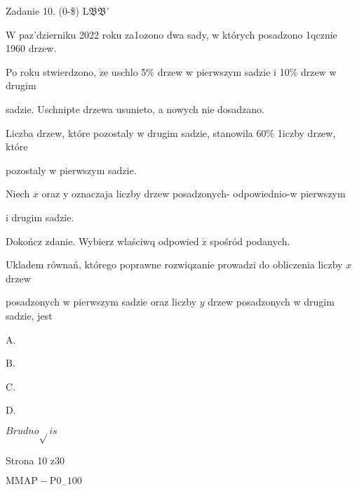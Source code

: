\documentclass[a4paper,12pt]{article}
\begin{document}
Zadanie 10. (0-{\$}) $\overline{\mathrm{L}\mathfrak{B}\mathfrak{B}}$'

$\mathrm{W}$ paz'dzierniku 2022 roku za1ozono dwa sady, w których posadzono 1qcznie 1960 drzew.

Po roku stwierdzono, $\dot{\mathrm{z}}\mathrm{e}$ uschlo 5\% drzew w pierwszym sadzie i 10\% drzew w drugim

sadzie. Uschnipte drzewa usunieto, a nowych nie dosadzano.

Liczba drzew, które pozostaly w drugim sadzie, stanowila 60\% 1iczby drzew, które

pozostaly w pierwszym sadzie.

Niech $x$ oraz $\mathrm{y}$ oznaczaja liczby drzew posadzonych- odpowiednio-w pierwszym

i drugim sadzie.

Dokończ zdanie. Wybierz wlaściwq odpowied $\acute{\mathrm{z}}$ spośród podanych.

Ukladem równań, którego poprawne rozwiqzanie prowadzi do obliczenia liczby $x$ drzew

posadzonych w pierwszym sadzie oraz liczby $y$ drzew posadzonych w drugim sadzie, jest

A. 

B. 

C. 

D. 

$Brudno\sqrt{}is$

Strona 10 z30

$\mathrm{M}\mathrm{M}\mathrm{A}\mathrm{P}-\mathrm{P}0_{-}100$
\end{document}
